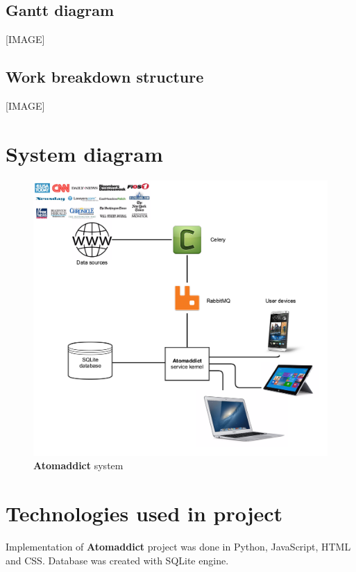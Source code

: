\documentclass[12pt]{article}
\begin{document}
\subsection{Gantt diagram}

[IMAGE]

\subsection{Work breakdown structure}

[IMAGE]

\section{System diagram}

\begin{figure}[H]
    \centering
    \includegraphics[width=\textwidth]{images/systemDiagram.png}
    \caption{\textbf{Atomaddict} system}
    \label{fig:trello}
\end{figure}

\section{Technologies used in project}
Implementation of \textbf{Atomaddict} project was done in Python, JavaScript, HTML and CSS. Database was created with SQLite engine.
\end{document}
